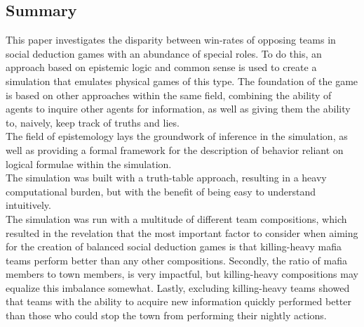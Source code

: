 \onecolumn
\begin{center}
	\section*{Summary}\label{sec:summary}
\end{center}
This paper investigates the disparity between win-rates of opposing teams in 
social deduction games with an abundance of special roles. To do  this, an 
approach based on epistemic logic and common sense is used to create a 
simulation that emulates physical games of this type. The foundation of the 
game is based on other approaches within the same field, combining the ability 
of agents to inquire other agents for information, as well as giving them the 
ability to, naively, keep track of truths and lies. \\
The field of epistemology lays the groundwork of inference in the simulation, 
as well as providing a formal framework for the description of behavior 
reliant on logical formulae within the simulation. \\
The simulation was built with a truth-table approach, resulting in a heavy 
computational burden, but with the benefit of being easy to understand 
intuitively. \\
The simulation was run with a multitude of different team compositions, which 
resulted in the revelation that the most important factor to consider when 
aiming for the creation of balanced social deduction games is that killing-heavy mafia teams perform better than any other compositions. Secondly, the ratio of mafia members to town members, is very impactful, but killing-heavy compositions may equalize this imbalance somewhat. Lastly, excluding killing-heavy teams showed that teams with the ability to acquire new information quickly performed better than those who could stop the town from performing their nightly actions. 
\twocolumn